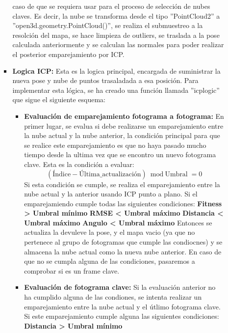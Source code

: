 \documentclass[12pt, a4paper, twoside]{article}
\begin{document}
\begin{itemize}
\begin{itemize}
\begin{itemize}
      caso de que se requiera usar para el proceso de selección de nubes claves. Es decir, la nube se transforma desde el tipo ''PointCloud2'' a 
      ''open3d.geometry.PointCloud()'', se realiza el submuestreo a la resolción del mapa, se hace limpieza de outliers, se traslada a la pose calculada anteriormente y 
      se calculan las normales para poder realizar el posterior emparejamiento por ICP.
      \item \textbf{Logica ICP:} Esta es la logica principal, encargada de suministrar la nueva pose y nube de puntos trasaladada a esa posición. Para implementar esta 
      lógica, se ha creado una función llamada ''icp\textunderscore logic'' que sigue el siguiente esquema:
      \begin{itemize}
        \item \textbf{Evaluación de emparejamiento fotograma a fotograma:} En primer lugar, se evalua si debe realizarse un emparejamiento entre la nube actual y la
        nube anterior, la condición principal para que se realice este emparejamiento es que no haya pasado mucho tiempo desde la ultima vez que se encontro un nuevo fotograma clave.
        Esta es la condición a evaluar:
        \[
        (\text{Índice} - \text{Última\_ actualización}) \bmod \text{Umbral} = 0
        \]
        Si esta condición se cumple, se realiza el emparejamiento entre la nube actual y la anterior usando ICP punto a plano. Si el emparejamiendo cumple todas las siguientes condiciones: \newline
        \textbf{Fitness > Umbral mínimo}\newline
        \textbf{RMSE < Umbral máximo}\newline
        \textbf{Distancia < Umbral máximo}\newline
        \textbf{Angulo < Umbral máximo}\newline
        Entonces se actualiza la devuleve la pose, y el mapa vacio (ya que no pertenece al grupo de fotogramas que cumple las condiocnes) y se almacena la nube actual como la nueva nube anterior.
        En caso de que no se cumpla alguna de las condiciones, pasaremos a comprobar si es un frame clave.
        \item \textbf{Evaluación de fotograma clave:} Si la evaluación anterior no ha cumplido alguna de las condiones, se intenta realizar un emparejamiento entre la nube actual y 
        el útlimo fotograma clave. Si este emparejamiento cumple alguna las siguientes condiciones:\newline
        \textbf{Distancia > Umbral mínimo}\newline

\end{itemize}
\end{itemize}
\end{itemize}
\end{itemize}
\end{document}
